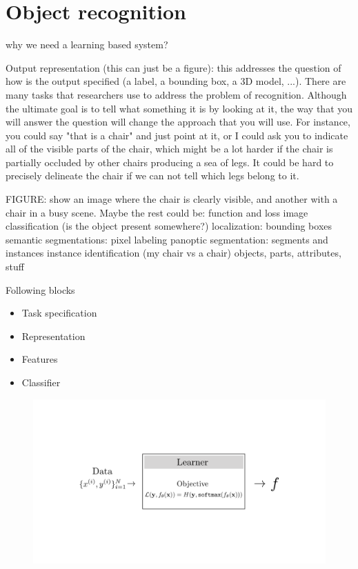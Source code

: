 
%	
%	
%	 
%

\chapter{Object recognition}

why we need a learning based system?

Output representation (this can  just  be a figure): this addresses the question of how is the output specified (a label, a bounding box, a 3D model, ...).
		There  are many tasks that researchers use to address  the problem of recognition. Although  the ultimate goal is to tell what something it is by looking at it, the way that you will answer the question will change the approach that you will  use. For instance, you could say "that is a chair" and just point  at it, or I could ask you to indicate all of the visible parts of the chair, which might be a lot  harder if the chair is partially occluded by other chairs producing a sea of legs. It could be hard to precisely delineate the chair if we can not tell which legs belong to it. 
		
		FIGURE: show an image where the chair is clearly visible, and another with a chair in a busy  scene. 
		Maybe  the rest could be: function and loss
		image classification (is the object present somewhere?)
		localization: bounding boxes
		semantic segmentations: pixel labeling 
		panoptic segmentation: segments and instances
		instance identification (my chair vs a chair)
		objects, parts, attributes, stuff
		


Following blocks
\begin{itemize}
\item Task specification
\item Representation
\item Features
\item Classifier
\end{itemize}


\begin{figure}[h]
    \centering
    \includegraphics[width=0.7\linewidth]{./figures/intro_to_learning/softmax_regression_learning_problem.pdf}
    \label{fig:softmax_regression_learning_problem}
\end{figure}


